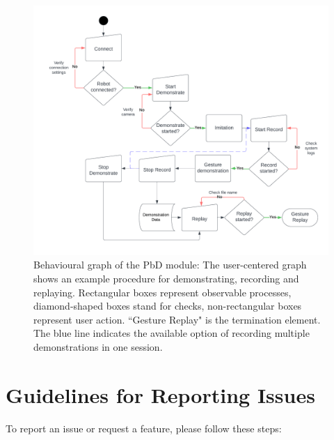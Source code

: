 \documentclass{CSSRforAfrica}
\begin{document}
\begin{figure}[H]
    \centering
    \includegraphics[width=\linewidth]{figures/BehaviouralGraph.png}
    \caption{Behavioural graph of the PbD module: The user-centered graph shows an example procedure for demonstrating, recording and replaying. Rectangular boxes represent observable processes, diamond-shaped boxes stand for checks, non-rectangular boxes represent user action. ``Gesture Replay" is the termination element. The blue line indicates the available option of recording multiple demonstrations in one session.}
    \label{fig:behavioural}
\end{figure}

\newpage

\section*{Guidelines for Reporting Issues} \label{sec:report}
To report an issue or request a feature, please follow these steps:
\end{document}

